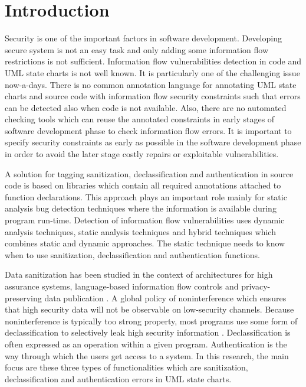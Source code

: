 \chapter{Introduction}
\label{chapter:Introduction}
Security is one of the important factors in software development. Developing secure system is not an easy task and only adding some information flow restrictions is not sufficient. Information flow vulnerabilities detection in code and UML state charts is not well known. It is particularly one of the challenging issue now-a-days. There is no common annotation language for annotating UML state charts and source code with
information flow security constraints such that errors can be detected also when code is not available. Also, there are
no automated checking tools which can reuse the annotated constraints in early stages of software development phase to check information flow errors. It is important to specify security constraints as early as possible in the software
development phase in order to avoid the later stage costly repairs or exploitable vulnerabilities.

A solution for tagging sanitization, declassification and authentication in source code is based on libraries which contain all required annotations attached to function declarations. This approach plays an important role mainly for static analysis bug detection techniques where the information is available during program run-time. Detection of information flow vulnerabilities uses dynamic analysis techniques, static analysis techniques and hybrid techniques which combines static and dynamic approaches. The static technique needs to know when to use  sanitization, declassification and authentication functions.

Data sanitization has been studied in the context of architectures for high assurance systems, language-based information flow controls and privacy-preserving data publication \cite{ref_1_gehani2011f}. A global policy of noninterference which ensures that high security data will not be observable on low-security channels. Because noninterference is typically too strong property, most programs use some form of declassification to selectively leak high security  information \cite{ref_2_hicks2006trusted}. Declassification is often expressed as an operation within a given
program. Authentication is the way through which the users get access to a system. In this research, the main focus are these three types of functionalities which are sanitization, declassification and authentication errors in UML state charts. 

